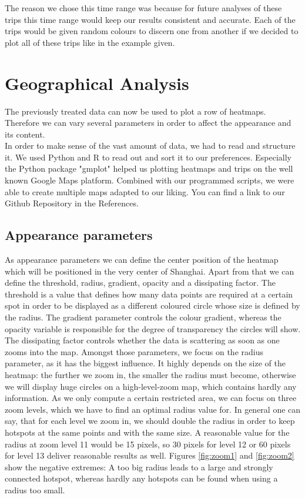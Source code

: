 \documentclass[11pt,conference,a4paper,twocolumns,romanappendices]{IEEEtran}
\begin{document}
The reason we chose this time range was because for future analyses of these trips this time range would keep our results consistent and accurate. Each of the trips would be given random colours to discern one from another if we decided to plot all of these trips like in the example given. \\

\section{Geographical Analysis}
The previously treated data can now be used to plot a row of heatmaps. Therefore we can vary several parameters in order to affect the appearance and its content.\\
In order to make sense of the vast amount of data, we had to read and structure it. We used Python and R to read out and sort it to our preferences. Especially the Python package "gmplot" \cite{gmplot} helped us plotting heatmaps and trips on the well known Google Maps platform. Combined with our programmed scripts, we were able to create multiple maps adapted to our liking. You can find a link to our Github Repository in the References. \cite{github-IoTTrace} \\
\subsection{Appearance parameters}
As appearance parameters we can define the center position of the heatmap which will be positioned in the very center of Shanghai. Apart from that we can define the threshold, radius, gradient, opacity and a dissipating factor. The threshold is a value that defines how many data points are required at a certain spot in order to be displayed as a different coloured circle whose size is defined by the radius. The gradient parameter controls the colour gradient, whereas the opacity variable is responsible for the degree of transparency the circles will show. The dissipating factor controls whether the data is scattering as soon as one zooms into the map.
Amongst those parameters, we focus on the radius parameter, as it has the biggest influence. It highly depends on the size of the heatmap: the further we zoom in, the smaller the radius must become, otherwise we will display huge circles on a high-level-zoom map, which contains hardly any information. As we only compute a certain restricted area, we can focus on three zoom levels, which we have to find an optimal radius value for. In general one can say, that for each level we zoom in, we should double the radius in order to keep hotspots at the same points and with the same size. A reasonable value for the radius at zoom level 11 would be 15 pixels, so 30 pixels for level 12 or 60 pixels for level 13 deliver reasonable results as well. Figures \ref{fig:zoom1} and \ref{fig:zoom2} show the negative extremes: A too big radius leads to a large and strongly connected hotspot, whereas hardly any hotspots can be found when using a radius too small.
\end{document}
